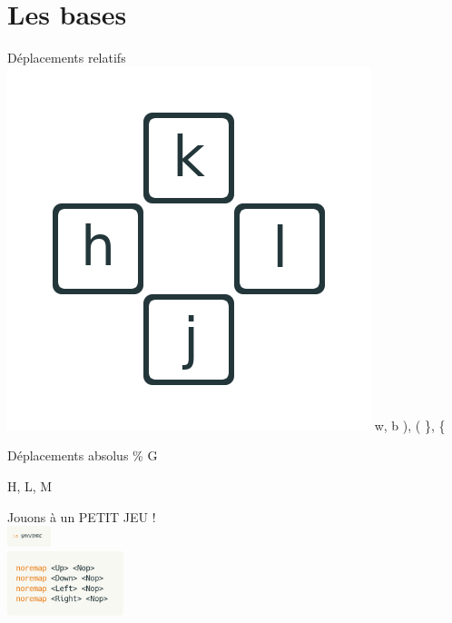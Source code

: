 \documentclass[10pt]{beamer}
\begin{document}
		\section{Les bases}
			\begin{frame}{Déplacements relatifs}
				\includegraphics{img/control-keys.png}
				w, b
				), (
				\}, \{

			\end{frame}

			\begin{frame}{Déplacements absolus}
				\%
				G

				H, L, M
			\end{frame}

		\begin{frame}[standout]
			Jouons à un PETIT JEU !\\
			\vspace{10pt}
			\includegraphics[width=48]{img/edit-vimrc.png}\\
			\vspace{10pt}
			\includegraphics[width=128]{img/harder.png}
		\end{frame}
\end{document}
